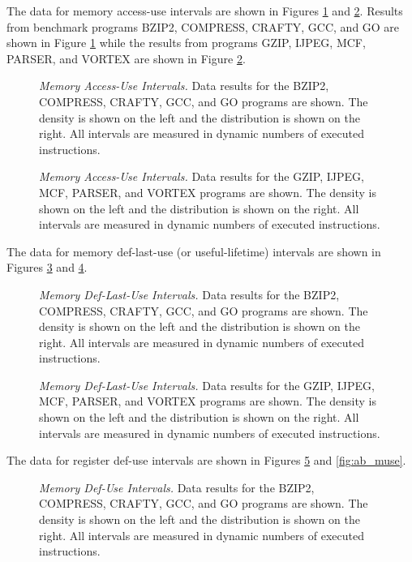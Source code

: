 \documentclass[10pt,dvips]{article}
\begin{document}
%
The data for memory access-use intervals are
shown in Figures \ref{fig:aa_mrint} 
and \ref{fig:ab_mrint}.
Results from benchmark programs BZIP2, COMPRESS, CRAFTY, GCC, and GO
are shown in Figure \ref{fig:aa_mrint} while the results
from programs GZIP, IJPEG, MCF, PARSER, and VORTEX are shown in
Figure \ref{fig:ab_mrint}.
%
\begin{figure}
\centering
{}
\caption{{\em Memory Access-Use Intervals.} 
Data results for the 
BZIP2, COMPRESS, CRAFTY, GCC, and GO programs are shown.
The density is shown on the left and the distribution is shown
on the right.
All intervals are measured in dynamic numbers of executed instructions.}
\label{fig:aa_mrint}
\end{figure}
%
\begin{figure}
\centering
{}
\caption{{\em Memory Access-Use Intervals.} 
Data results for the
GZIP, IJPEG, MCF, PARSER, and VORTEX programs are shown.
The density is shown on the left and the distribution is shown
on the right.
All intervals are measured in dynamic numbers of executed instructions.}
\label{fig:ab_mrint}
\end{figure}
%
%
%
The data for memory def-last-use (or useful-lifetime) intervals are
shown in Figures \ref{fig:aa_mlife} 
and \ref{fig:ab_mlife}.
%
\begin{figure}
\centering
{}
\caption{{\em Memory Def-Last-Use Intervals.} 
Data results for the 
BZIP2, COMPRESS, CRAFTY, GCC, and GO programs are shown.
The density is shown on the left and the distribution is shown
on the right.
All intervals are measured in dynamic numbers of executed instructions.}
\label{fig:aa_mlife}
\end{figure}
%
\begin{figure}
\centering
{}
\caption{{\em Memory Def-Last-Use Intervals.} 
Data results for the
GZIP, IJPEG, MCF, PARSER, and VORTEX programs are shown.
The density is shown on the left and the distribution is shown
on the right.
All intervals are measured in dynamic numbers of executed instructions.}
\label{fig:ab_mlife}
\end{figure}
%
%
%
The data for register def-use intervals are
shown in Figures \ref{fig:aa_muse} 
and \ref{fig:ab_muse}.
%
\begin{figure}
\centering
{}
\caption{{\em Memory Def-Use Intervals.} 
Data results for the 
BZIP2, COMPRESS, CRAFTY, GCC, and GO programs are shown.
The density is shown on the left and the distribution is shown
on the right.
All intervals are measured in dynamic numbers of executed instructions.}
\label{fig:aa_muse}
\end{figure}
\end{document}
